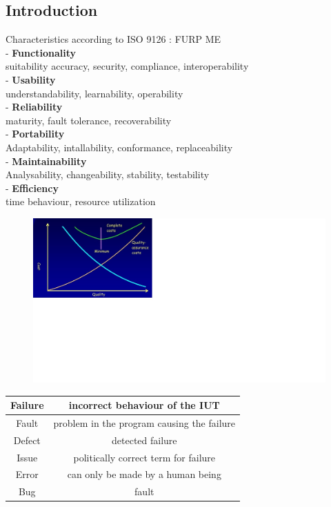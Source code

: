 \subsection{Introduction}
Characteristics according to ISO 9126 : FURP ME\\
- \textbf{Functionality}\\
 suitability accuracy, security, compliance, interoperability\\
- \textbf{Usability}\\
 understandability, learnability, operability\\
- \textbf{Reliability}\\
 maturity, fault tolerance, recoverability\\
- \textbf{Portability}\\
 Adaptability, intallability, conformance, replaceability\\
- \textbf{Maintainability}\\
 Analysability, changeability, stability, testability\\
- \textbf{Efficiency}\\
 time behaviour, resource utilization\\
 

\begin{figure}[h!]
\centering
\includegraphics[width=0.7\linewidth]{../images/testingQC.jpg}
\caption{}
\label{fig:testingQC}
\end{figure}

\begin{tabular}{c|c}
	Failure  & incorrect behaviour of the IUT \\ 
	\hline Fault  & problem in the program causing the failure \\ 
	\hline Defect & detected failure \\ 
	\hline Issue & politically correct term for failure \\ 
	\hline Error & can only be made by a human being  \\ 
	\hline Bug & fault \\ 	
\end{tabular} 

